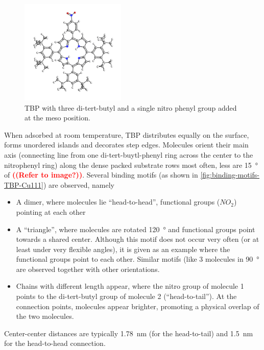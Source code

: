 \label{sec:single-TBP-Cu111}
\begin{figure}\centering
	\includegraphics[angle=90, width=5cm]{./images/molecules/max-zoom/TBP-single-600}
	\caption{TBP with three di-tert-butyl and a single nitro phenyl group added at the meso position.}
	\label{fig:}
\end{figure}
When adsorbed at room temperature, TBP distributes equally on the surface, forms unordered islands and decorates step edges. Molecules orient their main axis (connecting line from one di-tert-buytl-phenyl ring across the center to the nitrophenyl ring) along the dense packed substrate rows most often, less are \SI{15}{\degree} of \textcolor{red}{\textbf{((Refer to image?))}}. Several binding motifs (as shown in \autoref{fig:binding-motifs-TBP-Cu111}) are observed, namely
\begin{itemize}
 \item A dimer, where molecules lie ``head-to-head'', functional groups ($NO_2$) pointing at each other
 \item A ``triangle'', where molecules are rotated \SI{120}{\degree} and functional groups point towards a shared center. Although this motif does not occur very often (or at least under very flexible angles), it is given as an example where the functional groups point to each other. Similar motifs (like 3 molecules in \SI{90}{\degree} are observed together with other orientations. 
 \item Chains with different length appear, where the nitro group of molecule 1 points to the di-tert-butyl group of molecule 2 (``head-to-tail''). At the connection points, molecules appear brighter, promoting a physical overlap of the two molecules.
\end{itemize}

Center-center distances are typically \SI{1.78}{\nano \meter} (for the head-to-tail) and \SI{1.5}{\nano \meter} for the head-to-head connection. 

